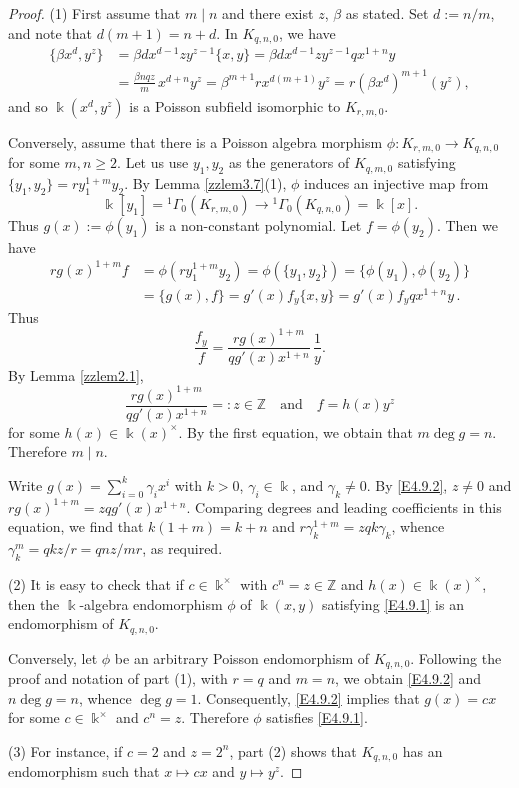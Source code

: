 \documentclass[12pt]{amsart}
\theoremstyle{plain}
\numberwithin{theorem}{section}
\numberwithin{equation}{theorem}
\theoremstyle{definition}
\newcommand{\ZZ}{\mathbb{Z}}
\newcommand \kx {\Bbbk^\times}
\begin{document}
\begin{proof}
(1) First assume that $m \mid n$ and there exist $z$, $\beta$ as stated.  Set $d := n/m$, and note that $d(m+1) = n+d$.  In $K_{q,n,0}$, we have
\begin{align*}
\{\beta x^d, y^z\} &= \beta d x^{d-1} z y^{z-1} \{x,y\} = \beta d x^{d-1} z y^{z-1} q x^{1+n}y  \\
&= \frac{\beta nqz}{m}\, x^{d+n} y^z = \beta^{m+1} r x^{d(m+1)} y^z = r(\beta x^d)^{m+1}(y^z),
\end{align*}
and so $\Bbbk(x^d,y^z)$ is a Poisson subfield isomorphic to $K_{r,m,0}$.

Conversely, assume that there is a Poisson algebra
morphism $\phi: K_{r,m,0}\to K_{q,n,0}$ for some $m,n\geq 2$. 
Let us use $y_1,y_2$ as the generators of $K_{q,m,0}$ 
satisfying $\{y_1,y_2\}= r y_1^{1+m} y_2$. By Lemma \ref{zzlem3.7}(1), $\phi$ 
induces an injective map from 
$$\Bbbk[y_1]={^1\Gamma}_{0}(K_{r,m,0}) \to {^1\Gamma}_{0}(K_{q,n,0})=\Bbbk[x].$$
Thus $g(x):=\phi(y_1)$ is a non-constant polynomial. 
Let $f=\phi(y_2)$. Then we have 
$$\begin{aligned}
r g(x)^{1+m} f
&=\phi(r y_1^{1+m} y_2)=\phi(\{y_1,y_2\}) =\{\phi(y_1),\phi(y_2)\}  \\
&=\{g(x),f\} =g'(x) f_{y}\{x,y\}=g'(x) f_{y}  q x^{1+n} y \,.
\end{aligned}
$$
Thus
$$\frac{f_{y}}{f}=\frac{r g(x)^{1+m}}{q g'(x) x^{1+n}}\,\frac{1}{y}.$$
By Lemma \ref{zzlem2.1},
\begin{equation}  
\label{E4.9.2}\tag{E4.9.2}
\frac{r g(x)^{1+m}}{q g'(x) x^{1+n}}=:z\in {\ZZ}
\quad
{\text{and}} \quad
f=h(x) y^z
\end{equation}
for some $h(x)\in \Bbbk(x)^\times$. By the first equation,
we obtain that $m\deg g= n$.
Therefore $m\mid n$.

Write $g(x) = \sum_{i=0}^k \gamma_i x^i$ with $k>0$, $\gamma_i \in \Bbbk$, and $\gamma_k \ne 0$.  By \eqref{E4.9.2}, $z \ne 0$ and $r g(x)^{1+m} = zq g'(x) x^{1+n}$.  Comparing degrees and leading coefficients in this equation, we find that $k(1+m) = k+n$ and $r \gamma_k^{1+m} = zqk \gamma_k$, whence $\gamma_k^m = qkz/r = qnz/mr$, as required.

(2) It is easy to check that if $c \in \kx$ with 
$c^n=z\in {\ZZ}$ and $h(x)\in \Bbbk(x)^{\times}$, 
then the $\Bbbk$-algebra endomorphism $\phi$ of 
$\Bbbk(x,y)$ satisfying \eqref{E4.9.1} is an 
endomorphism of $K_{q,n,0}$.

Conversely, let $\phi$ be an arbitrary Poisson endomorphism 
of $K_{q,n,0}$. Following the proof and notation of part (1), 
with $r=q$ and $m=n$, we obtain \eqref{E4.9.2} and $n \deg g = n$, 
whence $\deg g = 1$. Consequently, \eqref{E4.9.2} implies 
that $g(x)=cx$ for some $c \in \kx$ and $c^{n}=z$. 
Therefore $\phi$ satisfies \eqref{E4.9.1}.

(3) For instance, if $c=2$ and $z=2^n$, part (2) shows that $K_{q,n,0}$ has an endomorphism such that $x \mapsto cx$ and $y \mapsto y^z$.
\end{proof}
\end{document}

